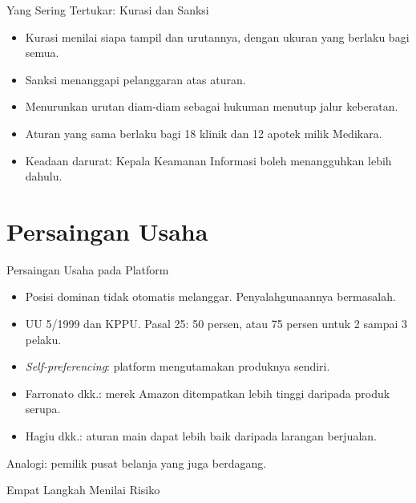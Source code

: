 \documentclass[aspectratio=169, table, 12pt]{beamer}
\begin{document}
\begin{frame}{{\Large Yang Sering Tertukar: Kurasi dan Sanksi}}
  \vspace{8pt}
  \begin{itemize}
    \item Kurasi menilai siapa tampil dan urutannya, dengan ukuran yang berlaku bagi semua.
    \item Sanksi menanggapi pelanggaran atas aturan.
    \item Menurunkan urutan diam-diam sebagai hukuman menutup jalur keberatan.
    \item Aturan yang sama berlaku bagi 18 klinik dan 12 apotek milik Medikara.
    \item Keadaan darurat: Kepala Keamanan Informasi boleh menangguhkan lebih dahulu.
  \end{itemize}
\end{frame}

\section{Persaingan Usaha}

\begin{frame}{{\Large Persaingan Usaha pada Platform}}
  \vspace{6pt}
  \begin{itemize}
    \item Posisi dominan tidak otomatis melanggar. Penyalahgunaannya bermasalah.
    \item UU 5/1999 dan KPPU. Pasal 25: 50 persen, atau 75 persen untuk 2 sampai 3 pelaku.
    \item \textit{Self-preferencing}: platform mengutamakan produknya sendiri.
    \item Farronato dkk.: merek Amazon ditempatkan lebih tinggi daripada produk serupa.
    \item Hagiu dkk.: aturan main dapat lebih baik daripada larangan berjualan.
  \end{itemize}
  \vspace{4pt}
  {\small Analogi: pemilik pusat belanja yang juga berdagang.}
\end{frame}

\begin{frame}{{\Large Empat Langkah Menilai Risiko}}
  \centering
\end{frame}
\end{document}
